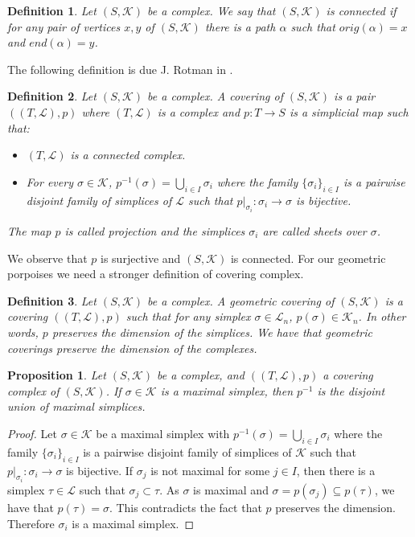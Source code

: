 \documentclass{amsart}
\newtheorem{proposition}{Proposition}[section]
\newtheorem{definition}{Definition}[section]
\begin{document}
\begin{definition}
Let $(S,\mathcal{K})$ be a complex. We say that $(S,\mathcal{K})$ is connected if for any pair of vertices $x,y$ of $(S,\mathcal{K})$ there is a path $\alpha$ such that $orig(\alpha)=x$ and $end(\alpha)=y$.
\end{definition}

The following definition is due J. Rotman in \cite{rotman1973covering}.

\begin{definition}
Let $(S,\mathcal{K})$ be a complex. A covering of $(S,\mathcal{K})$ is a pair $((T,\mathcal{L}),p)$ where $(T,\mathcal{L})$ is a complex and $p\colon T\longrightarrow S$ is a simplicial map such that:
\begin{itemize}
\item $(T,\mathcal{L})$ is a connected complex.
\item For every $\sigma\in\mathcal{K}$, $p^{-1}(\sigma)=\bigcup_{i\in I}\sigma_i$ where the family $\{\sigma_i\}_{i\in I}$ is a pairwise disjoint family of simplices of $\mathcal{L}$ such that $p|_{\sigma_i}\colon \sigma_i\longrightarrow \sigma$ is bijective.
\end{itemize}
The map $p$ is called projection and the simplices $\sigma_i$ are called sheets over $\sigma$.
\end{definition}

We observe that $p$ is surjective and $(S,\mathcal{K})$ is connected. For our geometric porpoises we need a stronger definition of covering complex.

\begin{definition}
Let $(S,\mathcal{K})$ be a complex. A geometric covering of $(S,\mathcal{K})$ is a covering $((T,\mathcal{L}),p)$ such that for any simplex $\sigma\in\mathcal{L}_n$, $p(\sigma)\in\mathcal{K}_n$. In other words, $p$ preserves the dimension of the simplices. We have that geometric coverings preserve the dimension of the complexes.
\end{definition}


\begin{proposition}
Let $(S,\mathcal{K})$ be a complex, and $((T,\mathcal{L}),p)$ a covering complex of $(S,\mathcal{K})$. If $\sigma\in\mathcal{K}$ is a maximal simplex, then $p^{-1}$ is the disjoint union of maximal simplices.
\end{proposition}

\begin{proof}
Let $\sigma\in\mathcal{K}$ be a maximal simplex with  $p^{-1}(\sigma)=\bigcup_{i\in I}\sigma_i$ where the family $\{\sigma_i\}_{i\in I}$ is a pairwise disjoint family of simplices of $\mathcal{K}$ such that $p|_{\sigma_i}\colon \sigma_i\longrightarrow \sigma$ is bijective. If $\sigma_j$ is not maximal for some $j\in I$, then there is a simplex $\tau\in\mathcal{L}$ such that $\sigma_j\subset \tau$. As $\sigma$ is maximal and $\sigma=p(\sigma_j)\subseteq p(\tau)$, we have that $p(\tau)=\sigma$. This contradicts the fact that $p$ preserves the dimension. Therefore $\sigma_i$ is a maximal simplex.
\end{proof}
\end{document}
